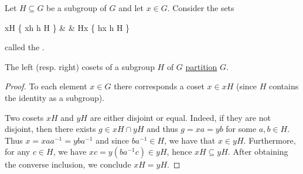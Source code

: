 \begin{definition}\label{def:group_cosets}
  Let \( H \subseteq G \) be a subgroup of \( G \) and let \( x \in G \). Consider the sets
  \begin{BreakableAlign*}
    xH \coloneqq \{ xh \colon h \in H \}
     &  &
    Hx \coloneqq \{ hx \colon h \in H \}
  \end{BreakableAlign*}
  called the .
\end{definition}

\begin{proposition}\label{thm:coset_partition}
  The left (resp. right) cosets of a subgroup \( H \) of \( G \) \hyperref[def:set_partition]{partition} \( G \).
\end{proposition}
\begin{proof}
  To each element \( x \in G \) there corresponds a coset \( x \in xH \) (since \( H \) contains the identity as a subgroup).

  Two cosets \( xH \) and \( yH \) are either disjoint or equal. Indeed, if they are not disjoint, then there exists \( g \in xH \cap yH \) and thus \( g = xa = yb \) for some \( a, b \in H \). Thus \( x = x a a^{-1} = y b a^{-1} \) and since \( b a^{-1} \in H \), we have that \( x \in yH \). Furthermore, for any \( c \in H \), we have \( xc = y(b a^{-1} c) \in yH \), hence \( xH \subseteq yH \). After obtaining the converse inclusion, we conclude \( xH = yH \).
\end{proof}

